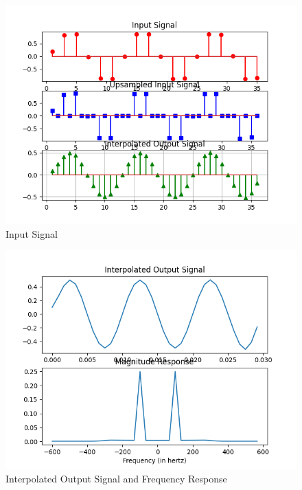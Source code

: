 \documentclass{article}
\begin{document}
\begin{figure}[ht]
  \centering
  \includegraphics[scale=0.8]{../figs/istem_plots.png}
  \caption{ Input Signal}
  \label{fig:istem_plots}
\end{figure}
\begin{figure}[ht]
  \centering
  \includegraphics[scale=0.8]{../figs/interpolated_output.png}
  \caption{Interpolated Output Signal and Frequency Response}
  \label{fig:interpolated_output}
\end{figure}
\end{document}
